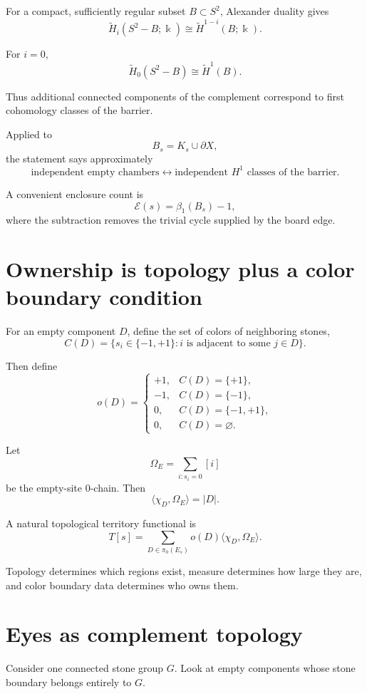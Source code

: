 \documentclass[11pt]{article}
\begin{document}
For a compact, sufficiently regular subset \(B\subset S^2\), Alexander duality gives
\[
\widetilde H_i(S^2-B;\Bbbk)
\cong
\widetilde H^{1-i}(B;\Bbbk).
\]

For \(i=0\),
\[
\boxed{
\widetilde H_0(S^2-B)
\cong
\widetilde H^1(B).
}
\]

Thus additional connected components of the complement correspond to first cohomology classes of the barrier.

Applied to
\[
B_s=K_s\cup\partial X,
\]
the statement says approximately
\[
\boxed{
\text{independent empty chambers}
\longleftrightarrow
\text{independent }H^1\text{ classes of the barrier}.
}
\]

A convenient enclosure count is
\[
\mathcal E(s)=\beta_1(B_s)-1,
\]
where the subtraction removes the trivial cycle supplied by the board edge.

\section{Ownership is topology plus a color boundary condition}

For an empty component \(D\), define the set of colors of neighboring stones,
\[
C(D)
=
\{s_i\in\{-1,+1\}:
i\text{ is adjacent to some }j\in D\}.
\]

Then define
\[
o(D)
=
\begin{cases}
+1,&C(D)=\{+1\},\\
-1,&C(D)=\{-1\},\\
0,&C(D)=\{-1,+1\},\\
0,&C(D)=\varnothing.
\end{cases}
\]

Let
\[
\Omega_E=\sum_{i:s_i=0}[i]
\]
be the empty-site 0-chain. Then
\[
\langle\chi_D,\Omega_E\rangle
=
|D|.
\]

A natural topological territory functional is
\[
\boxed{
T[s]
=
\sum_{D\in\pi_0(E_s)}
o(D)
\langle\chi_D,\Omega_E\rangle.
}
\]

Topology determines which regions exist, measure determines how large they are, and color boundary data determines who owns them.

\section{Eyes as complement topology}

Consider one connected stone group \(G\). Look at empty components whose stone boundary belongs entirely to \(G\).
\end{document}
